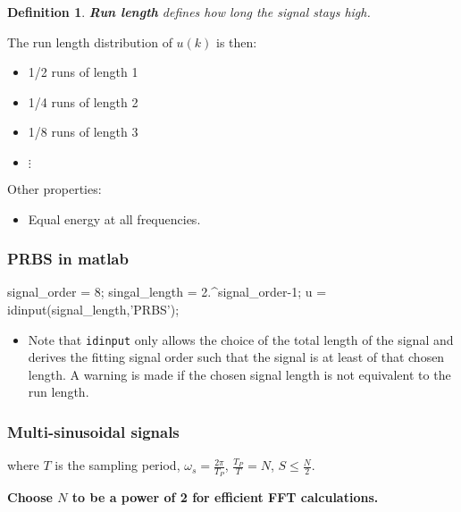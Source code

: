 \documentclass[10pt,a4paper]{scrartcl}
\newtheorem{define}{Definition}
\begin{document}
\begin{multicols*}{2}
\begin{define}
\textbf{Run length} defines how long the signal stays high.
\end{define}

The run length distribution of $u(k)$ is then:

\begin{itemize}
\item[] 1/2 runs of length 1
\item[] 1/4 runs of length 2
\item[] 1/8 runs of length 3
\item[] $\vdots$
\end{itemize}

Other properties:

\begin{itemize}
\item Equal energy at all frequencies.
\end{itemize}

\subsubsection{PRBS in matlab}

\begin{TPMatlab}
signal_order = 8;
singal_length = 2.^signal_order-1;
u = idinput(signal_length,'PRBS');
\end{TPMatlab}

\begin{itemize}
\item Note that \verb+idinput+ only allows the choice of the total length of the signal and derives the fitting signal order such that the signal is at least of that chosen length. A warning is made if the chosen signal length is not equivalent to the run length.
\end{itemize}

\subsubsection{Multi-sinusoidal signals}


where $T$ is the sampling period, $\omega_s=\frac{2\pi}{T_P}$, $\frac{T_P}{T}=N$, $S\leq\frac{N}{2}$.

\vspace{3ex}

\textbf{Choose $N$ to be a power of 2 for efficient FFT calculations.}


\end{multicols*}
\end{document}
